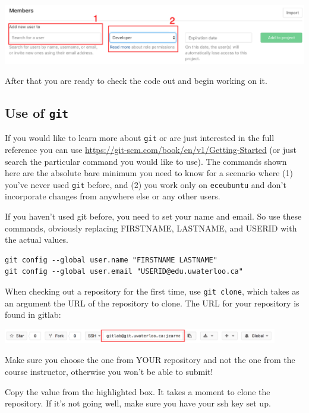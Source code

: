 \begin{center}
	\includegraphics[width=\textwidth]{images/gitlab-member-add.png}
\end{center}

After that you are ready to check the code out and begin working on it.


\subsection*{Use of \texttt{git}}
If you would like to learn more about \texttt{git} or are just interested in the full reference you can use \url{https://git-scm.com/book/en/v1/Getting-Started} (or just search the particular command you would like to use). The commands shown here are the absolute bare minimum you need to know for a scenario where (1) you've never used \texttt{git} before, and (2) you work only on \texttt{eceubuntu} and don't incorporate changes from anywhere else or any other users.

If you haven't used git before, you need to set your name and email. So use these commands, obviously replacing FIRSTNAME, LASTNAME, and USERID with the actual values.
\begin{lstlisting}
git config --global user.name "FIRSTNAME LASTNAME"
git config --global user.email "USERID@edu.uwaterloo.ca"
\end{lstlisting}

When checking out a repository for the first time, use \texttt{git clone}, which takes as an argument the URL of the repository to clone. The URL for your repository is found in gitlab:

\begin{center}
	\includegraphics[width=0.9\textwidth]{images/gitlab-clone.png}
\end{center}

Make sure you choose the one from YOUR repository and not the one from the course instructor, otherwise you won't be able to submit!

Copy the value from the highlighted box. It takes a moment to clone the repository. If it's not going well, make sure you have your ssh key set up.


